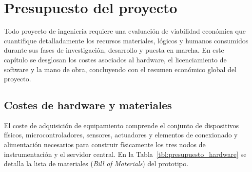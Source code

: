 \newpage
\section{Presupuesto del proyecto}
\label{cap:presupuesto}

Todo proyecto de ingeniería requiere una evaluación de viabilidad económica que cuantifique detalladamente los recursos materiales, lógicos y humanos consumidos durante sus fases de investigación, desarrollo y puesta en marcha. En este capítulo se desglosan los costes asociados al hardware, el licenciamiento de software y la mano de obra, concluyendo con el resumen económico global del proyecto.

\subsection{Costes de hardware y materiales}
\label{sec:costes_hardware}
El coste de adquisición de equipamiento comprende el conjunto de dispositivos físicos, microcontroladores, sensores, actuadores y elementos de conexionado y alimentación necesarios para construir físicamente los tres nodos de instrumentación y el servidor central. En la Tabla~\ref{tbl:presupuesto_hardware} se detalla la lista de materiales (\textit{Bill of Materials}) del prototipo.

